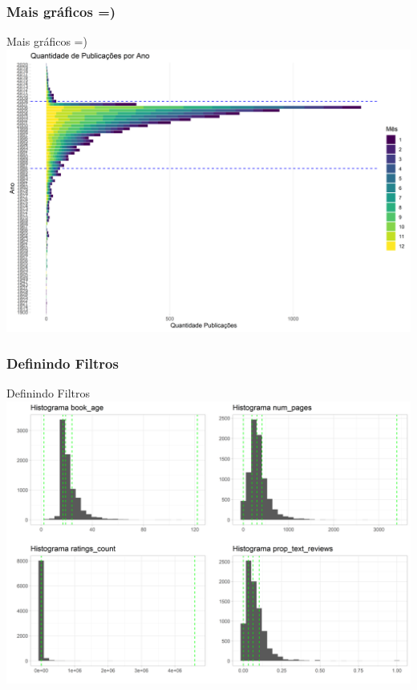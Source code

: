 \documentclass[
  9 pt,
  ignorenonframetext,
]{beamer}
\begin{document}
\hypertarget{mais-gruxe1ficos}{%
\subsubsection{Mais gráficos =)}\label{mais-gruxe1ficos}}

\begin{frame}{Mais gráficos =)}
\includegraphics{apresentacao_files/figure-beamer/unnamed-chunk-9-1.png}
\end{frame}

\hypertarget{definindo-filtros}{%
\subsubsection{Definindo Filtros}\label{definindo-filtros}}

\begin{frame}{Definindo Filtros}
\includegraphics{apresentacao_files/figure-beamer/unnamed-chunk-10-1.png}
\end{frame}
\end{document}
